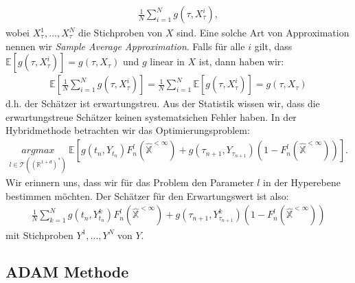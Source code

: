 \documentclass[12pt,titlepage,headsepline]{article}
\begin{document}
      \begin{align}\label{mc:opt-problem-approx}
        \frac{1}{N}\sum_{i=1}^N g(\tau,X_{\tau}^i),
      \end{align}
      wobei $X_{\tau}^1,\ldots,X_{\tau}^N$ die Stichproben von $X$ sind.
      Eine solche Art von Approximation nennen wir \textit{Sample Average Approximation}. Falls für alle $i$ gilt, dass $ \mathbb{E}[g(\tau,X_{\tau}^i)] = g(\tau,X_{\tau})$ und $g$ linear in $X$ ist, dann haben wir:
      \begin{align*}
        \mathbb{E}[\frac{1}{N}\sum_{i=1}^N g(\tau,X_{\tau}^i)] = \frac{1}{N}\sum_{i=1}^N \mathbb{E}[g(\tau,X_{\tau}^i)] = g(\tau,X_{\tau})
      \end{align*}
      d.h. der Schätzer ist erwartungstreu. Aus der Statistik wissen wir, dass die erwartungstreue Schätzer keinen systematsichen Fehler haben.
      \hfill\break
      In der Hybridmethode betrachten wir das Optimierungsproblem:
      \begin{align*}
        \underset{l \in \mathcal{T}((\mathbb{R}^{1+d})^*)}{argmax} \ \mathbb{E}[g(t_n, Y_{t_n})F_n^l(\hat{\mathbb{X}}^{< \infty})+g(\tau_{n+1},Y_{\tau_{n+1}})(1-F_n^l(\hat{\mathbb{X}}^{< \infty}))].
      \end{align*}
      Wir erinnern uns, dass wir für das Problem den Parameter $l$ in der Hyperebene bestimmen möchten. Der Schätzer für den Erwartungswert ist also:
      \begin{align*}
        \frac{1}{N} \sum_{k=1}^N g(t_n, Y^k_{t_n})F_n^l(\hat{\mathbb{X}}^{< \infty})+g(\tau_{n+1},Y^k_{\tau_{n+1}})(1-F_n^l(\hat{\mathbb{X}}^{< \infty}))
      \end{align*}
      mit Stichproben $Y^1,\ldots,Y^N$ von $Y$.
      \newpage

      \subsection{ADAM Methode}\label{appendix: adam method}
\end{document}
